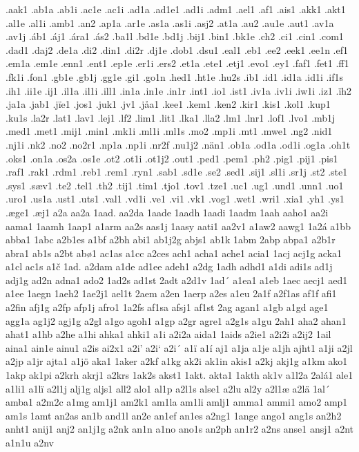 .aak1
.ab1a
.ab1i
.ac1e
.ac1i
.ad1a
.ad1e1
.ad1i
.adm1
.ael1
.af1
.ais1
.akk1
.akt1
.al1e
.al1i
.amb1
.an2
.ap1a
.ar1e
.as1a
.as1i
.asj2
.at1a
.au2
.au1e
.aut1
.av1a
.av1j
.áb1
.áj1
.ára1
.ás2
.ba1l
.bd1e
.bd1j
.bij1
.bin1
.bk1e
.ch2
.ci1
.cin1
.com1
.dad1
.daj2
.de1a
.di2
.din1
.di2r
.dj1e
.dob1
.dsu1
.eal1
.eb1
.ee2
.eek1
.ee1n
.ef1
.em1a
.em1e
.enn1
.ent1
.ep1e
.er1i
.ers2
.et1a
.ete1
.etj1
.evo1
.ey1
.faf1
.fet1
.ff1
.fk1i
.fon1
.gb1e
.gb1j
.gg1e
.gi1
.go1n
.hed1
.ht1e
.hu2s
.ib1
.id1
.id1a
.id1i
.if1s
.ih1
.ii1e
.ij1
.il1a
.il1i
.ill1
.in1a
.in1e
.in1r
.int1
.io1
.ist1
.iv1a
.iv1i
.iw1i
.iz1
.ïh2
.ja1a
.jab1
.jïe1
.jos1
.juk1
.jv1
.jåa1
.kee1
.kem1
.ken2
.kir1
.kis1
.kol1
.kup1
.ku1s
.la2r
.lat1
.lav1
.lej1
.lf2
.lim1
.lit1
.lka1
.lla2
.lm1
.lnr1
.lof1
.lvo1
.mb1j
.med1
.met1
.mij1
.min1
.mk1i
.ml1i
.ml1s
.mo2
.mp1i
.mt1
.mwe1
.ng2
.nid1
.nj1i
.nk2
.no2
.no2r1
.np1a
.np1i
.nr2f
.nu1j2
.nän1
.ob1a
.od1a
.od1i
.og1a
.oh1t
.oks1
.on1a
.os2a
.os1e
.ot2
.ot1i
.ot1j2
.out1
.ped1
.pem1
.ph2
.pig1
.pij1
.pis1
.raf1
.rak1
.rdm1
.reb1
.rem1
.ryn1
.sab1
.sd1e
.se2
.sed1
.sij1
.sl1i
.sr1j
.st2
.ste1
.sys1
.sæv1
.te2
.tel1
.th2
.tij1
.tim1
.tjo1
.tov1
.tze1
.uc1
.ug1
.und1
.unn1
.uo1
.uro1
.us1a
.ust1
.uts1
.val1
.vd1i
.ve1
.vi1
.vk1
.vog1
.wet1
.wri1
.xia1
.yh1
.ys1
.æge1
.æj1
a2a
aa2a
1aad.
aa2da
1aade
1aadh
1aadi
1aadm
1aah
aaho1
aa2i
aama1
1aamh
1aap1
a1arm
aa2s
aas1j
1aasy
aati1
aa2v1
a1aw2
aawg1
1a2á
a1bb
abba1
1abc
a2b1es
a1bf
a2bh
abi1
ab1j2g
abjs1
ab1k
1abm
2abp
abpa1
a2b1r
abra1
ab1s
a2bt
abø1
ac1as
a1cc
a2ces
ach1
acha1
ache1
acia1
1acj
acj1g
acka1
a1cl
ac1s
a1č
1ad.
a2dam
a1de
ad1ee
adeh1
a2dg
1adh
adhd1
a1di
adi1s
ad1j
adj1g
ad2n
adna1
ado2
1ad2s
ad1st
2adt
a2d1v
1ad´
a1ea1
a1eb
1aec
aecj1
aed1
a1ee
1aegn
1aeh2
1ae2j1
ael1t
2aem
a2en
1aerp
a2es
a1eu
2a1f
a2f1as
af1f
afi1
a2fin
afj1g
a2fp
afp1j
afro1
1a2fs
af1sa
afsj1
af1st
2ag
agan1
a1gb
a1gd
age1
agg1a
ag1j2
agj1g
a2gl
a1go
agoh1
a1gp
a2gr
agre1
a2g1s
a1gu
2ah1
aha2
ahan1
ahat1
a1hb
a2he
a1hi
ahka1
ahki1
a1i
a2i2a
aida1
1aids
a2ie1
a2i2i
a2ij2
1ail
aina1
ain1e
ainu1
a2is
ai2x1
a2i'
a2i`
a2i´
a1ï
a1í
aj1
a1ja
a1je
a1jh
ajht1
a1ji
a2jl
a2jp
a1jr
ajta1
a1jö
aka1
1aker
a2kf
a1kg
ak2i
ak1in
akis1
a2kj
akj1g
a1km
ako1
1akp
ak1pi
a2krh
akrj1
a2krs
1ak2s
akst1
1akt.
akta1
1akth
ak1v
a1l2a
2alá1
ale1
a1li1
a1lï
a2l1j
alj1g
aljs1
all2
alo1
al1p
a2l1s
alse1
a2lu
al2y
a2l1æ
a2lä
1al´
amba1
a2m2c
a1mg
am1j1
am2k1
am1la
am1li
amlj1
amma1
ammi1
amo2
amp1
am1s
1amt
an2as
an1b
and1l
an2e
an1ef
an1es
a2ng1
1ange
ango1
ang1s
an2h2
anht1
anij1
anj2
an1j1g
a2nk
an1n
a1no
ano1s
an2ph
an1r2
a2ns
anse1
ansj1
a2nt
a1n1u
a2nv
